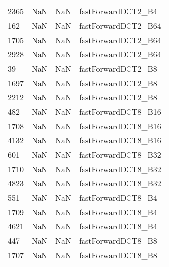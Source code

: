 \begin{tabular}{llll}
2365 &                   NaN &                        NaN &                        fastForwardDCT2\_B4 \\
162  &                   NaN &                        NaN &                       fastForwardDCT2\_B64 \\
1705 &                   NaN &                        NaN &                       fastForwardDCT2\_B64 \\
2928 &                   NaN &                        NaN &                       fastForwardDCT2\_B64 \\
39   &                   NaN &                        NaN &                        fastForwardDCT2\_B8 \\
1697 &                   NaN &                        NaN &                        fastForwardDCT2\_B8 \\
2212 &                   NaN &                        NaN &                        fastForwardDCT2\_B8 \\
482  &                   NaN &                        NaN &                       fastForwardDCT8\_B16 \\
1708 &                   NaN &                        NaN &                       fastForwardDCT8\_B16 \\
4132 &                   NaN &                        NaN &                       fastForwardDCT8\_B16 \\
601  &                   NaN &                        NaN &                       fastForwardDCT8\_B32 \\
1710 &                   NaN &                        NaN &                       fastForwardDCT8\_B32 \\
4823 &                   NaN &                        NaN &                       fastForwardDCT8\_B32 \\
551  &                   NaN &                        NaN &                        fastForwardDCT8\_B4 \\
1709 &                   NaN &                        NaN &                        fastForwardDCT8\_B4 \\
4621 &                   NaN &                        NaN &                        fastForwardDCT8\_B4 \\
447  &                   NaN &                        NaN &                        fastForwardDCT8\_B8 \\
1707 &                   NaN &                        NaN &                        fastForwardDCT8\_B8 \\

\end{tabular}
